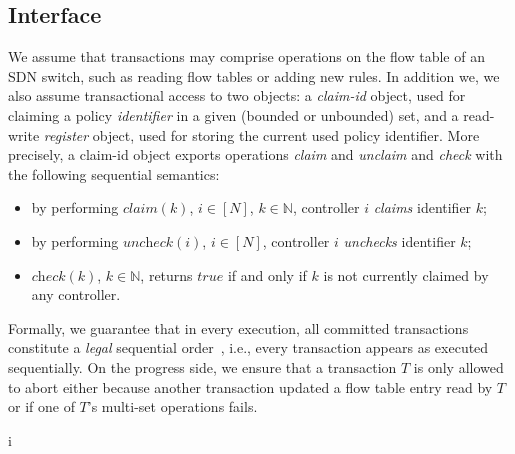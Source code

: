 \documentclass[conference]{sigcomm-alternate}
\newcommand{\Nat}{\mathbb{N}}
\begin{document}
\subsection{Interface}\label{sec:t-if}
We assume that transactions may comprise operations on the flow table
of an SDN switch, such as reading flow tables or adding new rules. 
In addition we, we also assume transactional access to  two objects: a
\emph{claim-id} object, used for claiming a policy \emph{identifier} in a
given (bounded or unbounded) set, and a read-write \emph{register}
object, used for storing the current used policy identifier.
%
More precisely, a claim-id object exports operations \emph{claim} and
\emph{unclaim} and \emph{check} with the following sequential
semantics:

\begin{itemize}
\item by performing $\textit{claim}(k)$, $i\in[N]$,
  $k\in\Nat$, controller $i$ \emph{claims} 
  identifier $k$;


\item by performing $\textit{uncheck}(i)$, $i\in[N]$, controller $i$
  \emph{unchecks} identifier $k$;  

\item $\textit{check}(k)$, $k\in\Nat$, returns $\textit{true}$ if and
  only if $k$ is not currently claimed by any controller.  

\end{itemize}  

Formally, we guarantee that in every execution, all committed
transactions constitute a \emph{legal} sequential
order~\cite{Pap79-serial}, i.e., every transaction appears as executed
sequentially. On the progress side, we ensure that a
transaction $T$ is only allowed to abort either because another 
transaction updated a flow table entry read by $T$  
or if one of $T$'s multi-set operations fails.

i%
\end{document}
